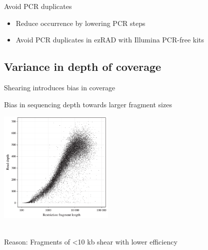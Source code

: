 \documentclass[presentation]{beamer}
\begin{document}
\begin{frame}[label=sec-3-1-3]{Avoid PCR duplicates}
\begin{itemize}
\item Reduce occurrence by lowering PCR steps
\item Avoid PCR duplicates in ezRAD with Illumina PCR-free kits
\end{itemize}
\end{frame}


\subsection{Variance in depth of coverage}
\label{sec-3-2}
\begin{frame}[label=sec-3-2-1]{Shearing introduces bias in coverage}
 \begin{center}
Bias in sequencing depth towards larger fragment sizes

\includegraphics[width=5.5cm]{Davey2013Fig3.png}

 \tiny{\citep{Davey2013}}\\
\normalsize{
Reason: Fragments of <10 kb shear with lower efficiency}
 \end{center}
\end{frame}
\end{document}

